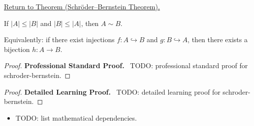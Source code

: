 \newpage
{}
\label{prf:schroder-bernstein}

\begin{remark*}[Return]
\hyperref[thm:schroder-bernstein]{Return to Theorem (Schröder--Bernstein Theorem).}
\end{remark*}

\begin{theorem*}
If $|A| \leq |B|$ and $|B| \leq |A|$, then $A \sim B$.

Equivalently: if there exist injections $f : A \hookrightarrow B$ and
$g : B \hookrightarrow A$, then there exists a bijection $h : A \to B$.
\end{theorem*}

\begin{proof}
\textbf{Professional Standard Proof.}~
TODO: professional standard proof for schroder-bernstein.
\end{proof}

\begin{proof}
\textbf{Detailed Learning Proof.}~
TODO: detailed learning proof for schroder-bernstein.
\end{proof}

\begin{remark*}
\end{remark*}

\begin{dependencies}
\begin{itemize}
  \item TODO: list mathematical dependencies.
\end{itemize}
\end{dependencies}

\clearpage
